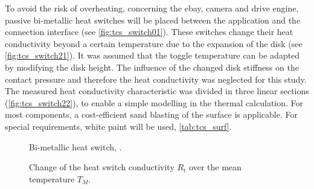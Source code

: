To avoid the risk of overheating, concerning the ebay, camera and drive engine, passive bi-metallic heat switches  will be  placed between the application and the connection interface (see \autoref{fig:tcs_switch01}).
These switches change their heat conductivity beyond a certain temperature due to the expansion of the disk (see \autoref{fig:tcs_switch21}).
It was assumed that the toggle temperature can be adapted by modifying the disk height.
The influence of the changed disk stiffness on the contact pressure and therefore the heat conductivity was neglected for this study.
The measured heat conductivity characteristic was divided in three linear sections (\autoref{fig:tcs_switch22}), to enable a simple modelling in the thermal calculation.
For most components, a cost-efficient sand blasting of the surface is applicable.
For special requirements, white paint will be used, \autoref{tab:tcs_surf}.

\begin{figure}[H]
	\centering
	\qquad\qquad
	\caption{Bi-metallic heat switch, \cite{ref_tcs_04}.}
	\label{fig:tcs_switch01}
\end{figure}

\begin{figure}[H]
	\centering
	\qquad
	\caption{Change of the heat switch conductivity $R_t$ over the mean temperature $T_M$.}
	\label{fig:tcs_switch02}
\end{figure}

